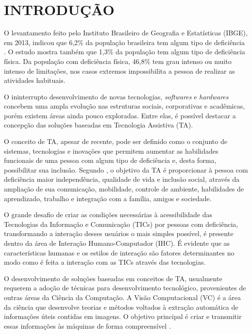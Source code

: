 \chapter{INTRODUÇÃO}\label{CAP:introducao}
O levantamento feito pelo Instituto Brasileiro de Geografia e Estatísticas (IBGE), em 2013, indicou que 6,2\% da população brasileira tem algum tipo de deficiência . O estudo mostra também que 1,3\% da população tem algum tipo de deficiência física. Da população com deficiência física, 46,8\% tem grau intenso ou muito intenso de limitações, nos casos extremos impossibilita a pessoa de realizar as atividades habituais.

O ininterrupto desenvolvimento de novas tecnologias, \textit{softwares} e \textit{hardwares} concebem uma ampla evolução nas estruturas sociais, corporativas e acadêmicas, porém existem áreas ainda pouco exploradas. Entre elas, é possível destacar a concepção das soluções baseadas em Tecnologia Assistiva (TA).

O conceito de TA, apesar de recente, pode ser definido como o conjunto de sistemas, tecnologias e inovações que permitem aumentar as habilidades funcionais de uma pessoa com algum tipo de deficiência e, desta forma, possibilitar sua inclusão. Segundo , o objetivo da TA é proporcionar à pessoa com deficiência maior independência, qualidade de vida e inclusão social, através da ampliação de sua comunicação, mobilidade, controle de ambiente, habilidades de aprendizado, trabalho e integração com a família, amigos e sociedade.

O grande desafio de criar as condições necessárias à acessibilidade das Tecnologias da Informação e Comunicação (TICs) por pessoas com deficiência, transformando a interação desses usuários o mais simples possível, é presente dentro da área de Interação Humano-Computador (IHC). É evidente que as características humanas e os estilos de interação são fatores determinantes no modo como é feita a interação com as TICs através das tecnologias.

O desenvolvimento de soluções baseadas em conceitos de TA, usualmente requerem a adoção de técnicas para desenvolvimento tecnológico, provenientes de outras áreas da Ciência da Computação. A Visão Computacional (VC) é a área da ciência que desenvolve teorias e métodos voltados à extração automática de informações úteis contidas em imagens. O objetivo principal é criar e transmitir essas informações às máquinas de forma compreensível \cite{prince2012computer}.


